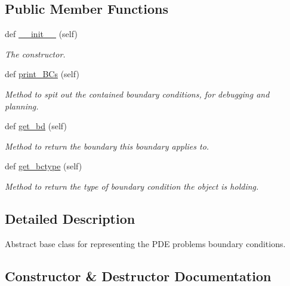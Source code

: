 \subsection*{Public Member Functions}
\begin{DoxyCompactItemize}
\item 
def \hyperlink{classMain__PDE__Repo_1_1src_1_1BCs_1_1BCs_a903a0a53c02b639940da31b9e90e4d0e}{\+\_\+\+\_\+init\+\_\+\+\_\+} (self)
\begin{DoxyCompactList}\small\item\em The constructor. \end{DoxyCompactList}\item 
def \hyperlink{classMain__PDE__Repo_1_1src_1_1BCs_1_1BCs_a77a1acda2d5b7301ac5ef3a883daffe2}{print\+\_\+\+B\+Cs} (self)
\begin{DoxyCompactList}\small\item\em Method to spit out the contained boundary conditions, for debugging and planning. \end{DoxyCompactList}\item 
def \hyperlink{classMain__PDE__Repo_1_1src_1_1BCs_1_1BCs_aa6cba1e1c68ddc840ee83d77575b6187}{get\+\_\+bd} (self)
\begin{DoxyCompactList}\small\item\em Method to return the boundary this boundary applies to. \end{DoxyCompactList}\item 
def \hyperlink{classMain__PDE__Repo_1_1src_1_1BCs_1_1BCs_a641fd30ccf5910519562cc4f9afc5206}{get\+\_\+bctype} (self)
\begin{DoxyCompactList}\small\item\em Method to return the type of boundary condition the object is holding. \end{DoxyCompactList}\end{DoxyCompactItemize}


\subsection{Detailed Description}
Abstract base class for representing the P\+DE problem\textquotesingle{}s boundary conditions. 



\subsection{Constructor \& Destructor Documentation}
\mbox{\label{classMain__PDE__Repo_1_1src_1_1BCs_1_1BCs_a903a0a53c02b639940da31b9e90e4d0e}} 
